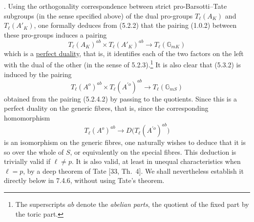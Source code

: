 %

\medskip
{}. Using the orthogonality correspondence between strict
pro-Barsotti--Tate subgroups (in the sense specified above) of the dual
pro-groups $T_\ell(A_K)$ and $T_\ell(A'_K)$, one formally deduces
from (5.2.2) that the pairing (1.0.2) between these pro-groups induces a
pairing
\begin{equation}\tag{5.3.2}
 T_\ell(A_K)^{ab}\times T_\ell(A'_K)^{ab}
 \longrightarrow T_\ell(\mathbb G_{mK})
\end{equation}
which is a \underline{perfect duality}, that is, it identifies each of
the two factors on the left with the dual of the other (in the sense of
5.2.3).\footnote{The superscripts $ab$ denote the \emph{abelian
parts}, the quotient of the fixed part by the toric part.}  It is also
clear that (5.3.2) is induced by the pairing
\begin{equation}\tag{5.3.3}
 T_\ell(A^o)^{ab}\times T_\ell(A^{\prime o})^{ab}
 \longrightarrow T_\ell(\mathbb G_{mS})
\end{equation}
obtained from the pairing (5.2.4.2) by passing to the quotients.  Since
this is a perfect duality on the generic fibres, that is, since the
corresponding homomorphism
\begin{equation}\tag{5.3.4}
 T_\ell(A^o)^{ab}
 \longrightarrow D\bigl(T_\ell(A^{\prime o})^{ab}\bigr)
\end{equation}
is an isomorphism on the generic fibres, one naturally wishes to deduce
that it is so over the whole of $S$, or equivalently on the special
fibres.  This deduction is trivially valid if $\ell\neq p$.  It is
also valid, at least in unequal characteristics when $\ell=p$, by a
deep theorem of Tate [33, Th.\ 4].  We shall nevertheless establish it
directly below in 7.4.6, without using Tate's theorem.


